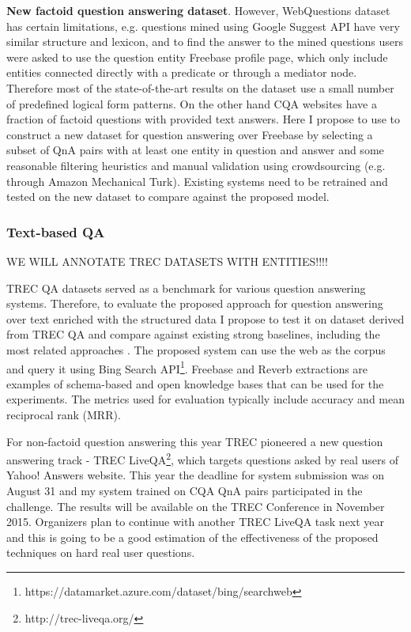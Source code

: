 \textbf{New factoid question answering dataset}. However, WebQuestions dataset has certain limitations, e.g. questions mined using Google Suggest API have very similar structure and lexicon, and to find the answer to the mined questions users were asked to use the question entity Freebase profile page,  which only include entities connected directly with a predicate or through a mediator node.
Therefore most of the state-of-the-art results on the dataset use a small number of predefined logical form patterns.
On the other hand CQA websites have a fraction of factoid questions with provided text answers.
Here I propose to use to construct a new dataset for question answering over Freebase by selecting a subset of QnA pairs with at least one entity in question and answer and some reasonable filtering heuristics and manual validation using crowdsourcing (e.g. through Amazon Mechanical Turk).
Existing systems need to be retrained and tested on the new dataset to compare against the proposed model.

\subsubsection{Text-based QA}

WE WILL ANNOTATE TREC DATASETS WITH ENTITIES!!!!

TREC QA datasets served as a benchmark for various question answering systems.
Therefore, to evaluate the proposed approach for question answering over text enriched with the structured data I propose to test it on dataset derived from TREC QA and compare against existing strong baselines, including the most related approaches \cite{Fader:2014:OQA:2623330.2623677,Sun:2015:ODQ:2736277.2741651}.
The proposed system can use the web as the corpus and query it using Bing Search API\footnote{https://datamarket.azure.com/dataset/bing/searchweb}.
Freebase and Reverb extractions \cite{FaderSE11} are examples of schema-based and open knowledge bases that can be used for the experiments.
The metrics used for evaluation typically include accuracy and mean reciprocal rank (MRR).

For non-factoid question answering this year TREC pioneered a new question answering track - TREC LiveQA\footnote{http://trec-liveqa.org/}, which targets questions asked by real users of Yahoo! Answers website.
This year the deadline for system submission was on August 31 and my system trained on CQA QnA pairs participated in the challenge.
The results will be available on the TREC Conference in November 2015.
Organizers plan to continue with another TREC LiveQA task next year and this is going to be a good estimation of the effectiveness of the proposed techniques on hard real user questions.



